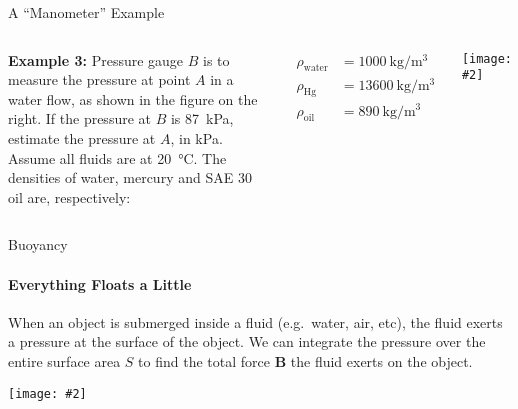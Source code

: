 \documentclass[12pt,aspectratio=169]{beamer}
\newcommand{\pic}[2]{\texttt{[image: \#2]}}
\newcommand{\mb}[1]{\mathbf{#1}}
\begin{document}
\begin{frame}{A ``Manometer'' Example}
  \begin{columns}

    \textbf{Example 3:} Pressure gauge $B$ is to measure the pressure at point
    $A$ in a water flow, as shown in the figure on the right. If the pressure at
    $B$ is \SI{87}{\kilo\pascal}, estimate the pressure at $A$, in
    \si{\kilo\pascal}. Assume all fluids are at \SI{20}{\celsius}. The
    densities of water, mercury and SAE 30 oil are, respectively:

    \vspace{-.3in}
    \begin{align*}
      \rho_\mathrm{water}&=\SI{1000}{\kilo\gram\per\metre^3}\\
      \rho_\mathrm{Hg}&=\SI{13600}{\kilo\gram\per\metre^3}\\
      \rho_\mathrm{oil}&=\SI{890}{\kilo\gram\per\metre^3}
    \end{align*}
    
    \pic{1}{mano.jpg}
  \end{columns}
\end{frame}



%
%    



\begin{frame}{Buoyancy}
  \framesubtitle{Everything Floats a Little}
  When an object is submerged inside a fluid (e.g.\ water, air, etc), the fluid
  exerts a pressure at the surface of the object. We can integrate the pressure
  over the entire surface area $S$ to find the total force $\mb{B}$ the fluid
  exerts on the object.
  \begin{center}
    \pic{.35}{rock_fbvectors.jpg}
  \end{center}
\end{frame}
\end{document}
